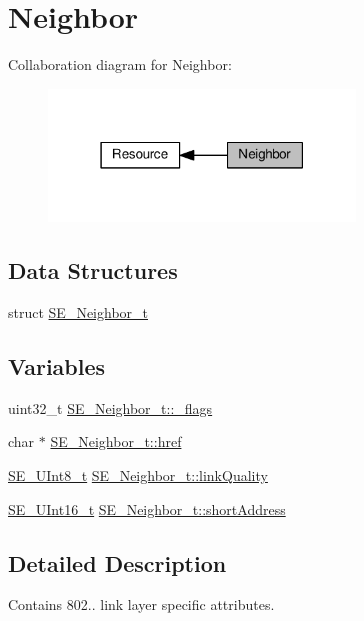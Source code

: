 \hypertarget{group__Neighbor}{}\section{Neighbor}
\label{group__Neighbor}
Collaboration diagram for Neighbor\+:\nopagebreak
\begin{figure}[H]
\begin{center}
\leavevmode
\includegraphics[width=231pt]{group__Neighbor}
\end{center}
\end{figure}
\subsection*{Data Structures}
\begin{DoxyCompactItemize}
\item 
struct \hyperlink{structSE__Neighbor__t}{S\+E\+\_\+\+Neighbor\+\_\+t}
\end{DoxyCompactItemize}
\subsection*{Variables}
\begin{DoxyCompactItemize}
\item 
uint32\+\_\+t \hyperlink{group__Neighbor_ga0518ed6ff88d279fae8395c91ddbb35f}{S\+E\+\_\+\+Neighbor\+\_\+t\+::\+\_\+flags}
\item 
char $\ast$ \hyperlink{group__Neighbor_gad4838ad5ed4427be8519b653f9bf1d19}{S\+E\+\_\+\+Neighbor\+\_\+t\+::href}
\item 
\hyperlink{group__UInt8_gaf7c365a1acfe204e3a67c16ed44572f5}{S\+E\+\_\+\+U\+Int8\+\_\+t} \hyperlink{group__Neighbor_gab26edd9f3b909788d724f45d6d7cd831}{S\+E\+\_\+\+Neighbor\+\_\+t\+::link\+Quality}
\item 
\hyperlink{group__UInt16_gac68d541f189538bfd30cfaa712d20d29}{S\+E\+\_\+\+U\+Int16\+\_\+t} \hyperlink{group__Neighbor_ga76779342274466f668ade7f1d80148ae}{S\+E\+\_\+\+Neighbor\+\_\+t\+::short\+Address}
\end{DoxyCompactItemize}


\subsection{Detailed Description}
Contains 802.. link layer specific attributes. 

